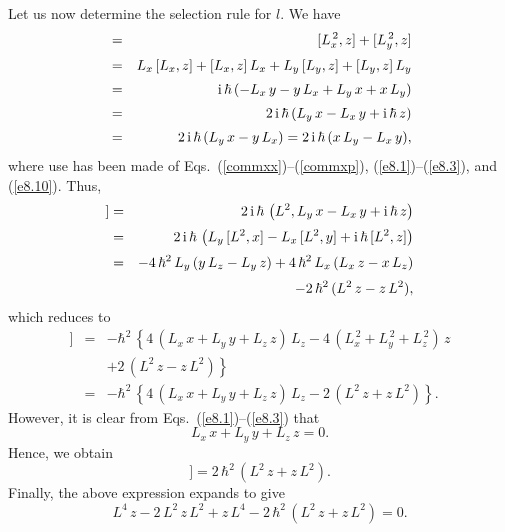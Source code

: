 Let us now determine the selection rule for $l$. We have
\begin{eqnarray}
[L^2,z]&=& [L_x^{\,2},z] + [L_y^{\,2},z]\nonumber\\[0.5ex]
& =& L_x\,[L_x,z] + [L_x,z]\,L_x + L_y\,[L_y,z]+[L_y,z]\,L_y\nonumber\\[0.5ex]
&=& {\rm i}\,\hbar\,(-L_x\,y-y\,L_x+L_y\,x+x\,L_y)\nonumber\\[0.5ex]
&=& 2\,{\rm i}\,\hbar\,(L_y\,x -L_x\,y + {\rm i}\,\hbar\,z)\nonumber\\[0.5ex]
&=& 2\,{\rm i}\,\hbar\,(L_y\,x - y\,L_x) = 2\,{\rm i}\,\hbar\,(x\,L_y-L_x\,y),
\end{eqnarray}
where use has been made of Eqs.~(\ref{commxx})--(\ref{commxp}), (\ref{e8.1})--(\ref{e8.3}), and (\ref{e8.10}).
Thus,
\begin{eqnarray}
[L^2,[L^2,z]]&=& 2\,{\rm i}\,\hbar\,\left(L^2, L_y\,x-L_x\,y + {\rm i}\,\hbar\,z\right)\nonumber\\[0.5ex]
&=& 2\,{\rm i}\,\hbar\,\left(L_y\,[L^2,x] - L_x\,[L^2,y] + {\rm i}\,\hbar\,[L^2,z]\right)\nonumber\\[0.5ex]
&=&-4\,\hbar^2\,L_y\,(y\,L_z-L_y\,z) + 4\,\hbar^2\,L_x\,(L_x\,z-x\,L_z)\nonumber\\[0.5ex]
&&-2\,\hbar^2\,(L^2\,z-z\,L^2),
\end{eqnarray}
which reduces to
\begin{eqnarray}
[L^2,[L^2,z]]&=& -\hbar^2\,\left\{4\,(L_x\,x+ L_y\,y+L_z\,z)\,L_z
-4\,(L_x^{\,2}+L_y^{\,2}+L_z^{\,2})\,z\right.\nonumber\\[0.5ex]
&&\left.+2\,(L^2\,z-z\,L^2)\right\}\nonumber\\[0.5ex]
&=&  -\hbar^2\,\left\{4\,(L_x\,x+ L_y\,y+L_z\,z)\,L_z-2\,(L^2\,z+z\,L^2)\right\}.
\end{eqnarray}
However, it is clear from Eqs.~(\ref{e8.1})--(\ref{e8.3}) that
\begin{equation}
L_x\,x+L_y\,y+L_z\,z = 0.
\end{equation}
Hence, we obtain
\begin{equation}
[L^2,[L^2,z]] = 2\,\hbar^2\,(L^2\,z+z\,L^2).
\end{equation}
Finally, the above expression expands to give
\begin{equation}\label{e12.69}
L^4\,z-2\,L^2\,z\,L^2 + z\,L^4 - 2\,\hbar^2\,(L^2\,z+z\,L^2) = 0.
\end{equation}

